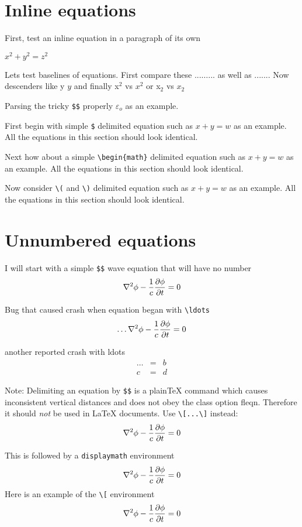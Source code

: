 \documentclass{article}
\begin{document}
\section{Inline equations}
First, test an inline equation in a paragraph of its own

$x^2+y^2=z^2$

Lets test baselines of equations.  First compare these ...$\ldots$... as
well as ...$.$...  Now descenders like y $y$ and finally x$^2$ vs $x^2$ or
x$_2$ vs $x_2$

Parsing the tricky \verb#$$# properly $\varepsilon $$_o$ as an example.

First begin with simple \verb#$# delimited equation such as
$x+y=w$ as an example.  All the equations in this section should
look identical.

Next how about a simple \verb#\begin{math}# delimited equation such as
\begin{math}x+y=w\end{math} as an example.  All the equations in this section should
look identical.

Now consider \verb#\(# and \verb#\)# delimited equation such as
\(x+y=w\) as an example.  All the equations in this section should
look identical.

\section{Unnumbered equations}

I will start with a simple \verb#$$# wave equation
that will have no number
$$
\nabla^2 \phi -{1\over c} {\partial \phi\over \partial t}  = 0
$$

Bug that caused crash when equation began with \verb#\ldots#
$$
\ldots\nabla^2 \phi -{1\over c} {\partial \phi\over \partial t}  = 0
$$

another reported crash with ldots
\begin{eqnarray*} 
\ldots & = & b \\
c      & = & d
\end{eqnarray*} 

Note: Delimiting an equation by \verb|$$| is a plain\TeX{} command
which causes inconsistent vertical distances and does not obey
the class option \textsf{fleqn}.
Therefore it should \emph{not} be used in \LaTeX{} documents. Use
\verb#\[...\]# instead:
\[
\nabla^2 \phi -{1\over c} {\partial \phi\over \partial t}  = 0
\]


This is followed by a \verb#displaymath# environment
\begin{displaymath}
\nabla^2 \phi -{1\over c} {\partial \phi\over \partial t}  = 0
\end{displaymath}
Here is an example of the \verb#\[# environment
\[
\nabla^2 \phi -{1\over c} {\partial \phi\over \partial t}  = 0
\]
\end{document}
